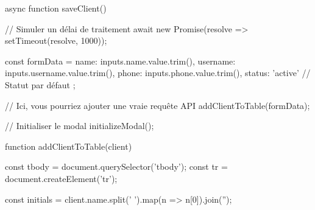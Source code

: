 {{        async function saveClient() {
            // Simuler un délai de traitement
            await new Promise(resolve => setTimeout(resolve, 1000));
            
            const formData = {
                name: inputs.name.value.trim(),
                username: inputs.username.value.trim(),
                phone: inputs.phone.value.trim(),
                status: 'active' // Statut par défaut
            };

            // Ici, vous pourriez ajouter une vraie requête API
            addClientToTable(formData);
        }
    }

    // Initialiser le modal
    initializeModal();

    function addClientToTable(client) {
        const tbody = document.querySelector('tbody');
        const tr = document.createElement('tr');
        
        const initials = client.name.split(' ').map(n => n[0]).join('');
        
}}
